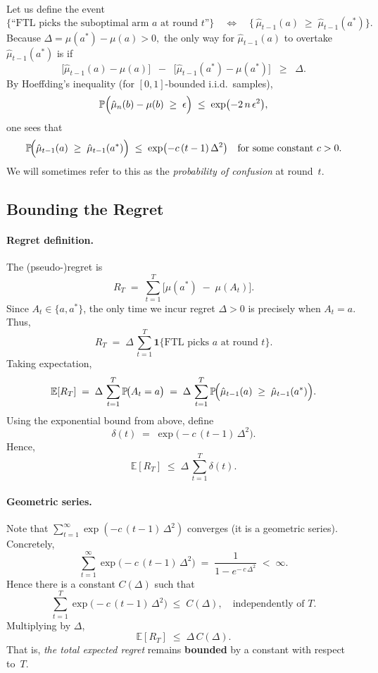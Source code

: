 Let us define the event
\[
  \bigl\{\text{``FTL picks the suboptimal arm $a$ at round $t$''}\bigr\}
  \quad\Longleftrightarrow\quad
  \bigl\{\,\hat{\mu}_{t-1}(a) \;\ge\;\hat{\mu}_{t-1}(a^*)\bigr\}.
\]
Because $\Delta = \mu(a^*) - \mu(a) > 0,$ the only way for $\hat{\mu}_{t-1}(a)$ to overtake $\hat{\mu}_{t-1}(a^*)$ is if
\[
   \bigl[\hat{\mu}_{t-1}(a) - \mu(a)\bigr]
   \;\;-\;\;
   \bigl[\hat{\mu}_{t-1}(a^*) - \mu(a^*)\bigr]
   \;\;\ge\;\;\Delta.
\]
By Hoeffding's inequality (for $[0,1]$-bounded i.i.d.\ samples),
\[
  \mathbb{P}\Bigl(\hat{\mu}_{n}(b) - \mu(b)\;\ge\;\epsilon\Bigr)
  \;\le\;
  \exp\bigl(-2\,n\,\epsilon^2\bigr),
\]
one sees that
\[
  \mathbb{P}\!\Bigl(\hat{\mu}_{t-1}(a)\;\ge\;\hat{\mu}_{t-1}(a^*)\Bigr)
  \;\le\;
  \exp\bigl(-c\,(t-1)\,\Delta^2\bigr)
  \quad
  \text{for some constant }c>0.
\]
We will sometimes refer to this as the \emph{probability of confusion} at round~$t$.

\subsection*{Bounding the Regret}

\paragraph{Regret definition.}
The (pseudo-)regret is
\[
  R_T
  \;=\;
  \sum_{t=1}^T
  \bigl[\mu(a^*) \;-\;\mu(A_t)\bigr].
\]
Since $A_t\in\{a,a^*\}$, the only time we incur regret $\Delta>0$ is precisely when $A_t=a$.  Thus,
\[
  R_T
  \;=\;
  \Delta \,\sum_{t=1}^T \mathbf{1}\{\text{FTL picks $a$ at round $t$}\}.
\]
Taking expectation,
\[
  \mathbb{E}[R_T]
  \;=\;
  \Delta \,\sum_{t=1}^T
  \mathbb{P}\!\bigl(A_t = a\bigr)
  \;=\;
  \Delta \,\sum_{t=1}^T
  \mathbb{P}\!\Bigl(\hat{\mu}_{t-1}(a)\;\ge\;\hat{\mu}_{t-1}(a^*)\Bigr).
\]
Using the exponential bound from above, define
\[
  \delta(t)
  \;=\;
  \exp\bigl(-c\,(t-1)\,\Delta^2\bigr).
\]
Hence,
\[
  \mathbb{E}[R_T]
  \;\le\;
  \Delta \,\sum_{t=1}^T \delta(t).
\]

\paragraph{Geometric series.}
Note that $\sum_{t=1}^\infty \exp(-c\,(t-1)\,\Delta^2)$ converges (it is a geometric series).  Concretely,
\[
  \sum_{t=1}^\infty
  \exp\bigl(-c\,(t-1)\,\Delta^2\bigr)
  \;=\;
  \frac{1}{1 - e^{-\,c\,\Delta^2}}
  \;<\;\infty.
\]
Hence there is a constant $C(\Delta)$ such that
\[
  \sum_{t=1}^T
  \exp\bigl(-c\,(t-1)\,\Delta^2\bigr)
  \;\le\;
  C(\Delta),
  \quad
  \text{independently of $T$.}
\]
Multiplying by $\Delta$,
\[
  \mathbb{E}[R_T]
  \;\le\;
  \Delta \,C(\Delta).
\]
That is, \emph{the total expected regret} remains \textbf{bounded} by a constant with respect to~$T$.

